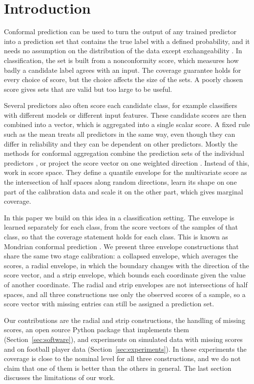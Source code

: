 \section{Introduction}\label{sec:intro}

Conformal prediction can be used to turn the output of any trained predictor into a prediction set that contains the 
true label with a defined probability, and it needs no assumption on the distribution of the data except exchangeability 
\citep{vovk2005algorithmic,shafer2008tutorial,angelopoulos2023conformal}. In classification, the set is built from a 
nonconformity score, which measures how badly a candidate label agrees with an input. The coverage guarantee holds 
for every choice of score, but the choice affects the size of the sets. A poorly chosen score gives sets that are valid 
but too large to be useful.

Several predictors also often score each candidate class, for example classifiers with different models or different input 
features. These candidate scores are then combined into a vector, which is aggregated into a single scalar score. A 
fixed rule such as the mean treats all predictors in the same way, even though they can differ in reliability and they 
can be dependent on other predictors. Mostly the methods for conformal aggregation combine the prediction sets of the 
individual predictors \citep{gasparin2024merging,yang2024selection}, or project the score vector on one weighted direction 
\citep{luo2024weighted}. Instead of this, \citet{ochoarivera2024conformal} work in score space. They 
define a quantile envelope for the multivariate score as the intersection of half spaces along random directions, learn 
its shape on one part of the calibration data and scale it on the other part, which gives marginal coverage.

In this paper we build on this idea in a classification setting. The envelope is learned separately for each class, 
from the score vectors of the samples of that class, so that the coverage statement holds for each class. This is known 
as Mondrian conformal prediction \citep{vovk2005algorithmic}. We present three envelope constructions that share the same 
two stage calibration: a collapsed envelope, which averages the scores, a radial envelope, in which the boundary changes 
with the direction of the score vector, and a strip envelope, which bounds each coordinate given the value of another 
coordinate. The radial and strip envelopes are not intersections of half  spaces, and all three constructions use only 
the observed scores of a sample, so a score vector with missing entries can still be assigned a prediction set.


Our contributions are the radial and strip constructions, the handling of missing scores, an open source Python package that 
implements them (Section~\ref{sec:software}), and experiments on simulated data with missing scores and on football player 
data (Section~\ref{sec:experiments}). In these experiments the coverage is close to the nominal level for all three 
constructions, and we do not claim that one of them is better than the others in general. The last section discusses the 
limitations of our work.
